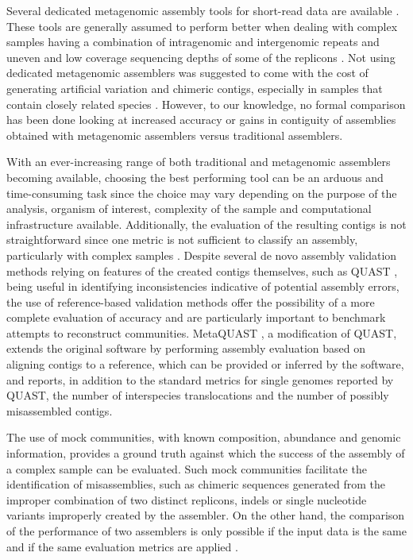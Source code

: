Several dedicated metagenomic assembly tools for short-read data are available \cite{ayling_new_2020}. These tools are generally assumed to perform better when dealing with complex samples having a combination of intragenomic and intergenomic repeats and uneven and low coverage sequencing depths of some of the replicons \cite{olson_metagenomic_2019}. Not using dedicated metagenomic assemblers was suggested to come with the cost of generating artificial variation and chimeric contigs, especially in samples that contain closely related species \cite{teeling_current_2012}. However, to our knowledge, no formal comparison has been done looking at increased accuracy or gains in contiguity of assemblies obtained with metagenomic assemblers versus traditional assemblers.

With an ever-increasing range of both traditional and metagenomic assemblers becoming available, choosing the best performing tool can be an arduous and time-consuming task since the choice may vary depending on the purpose of the analysis, organism of interest, complexity of the sample and computational infrastructure available. Additionally, the evaluation of the resulting contigs is not straightforward since one metric is not sufficient to classify an assembly, particularly with complex samples \cite{olson_metagenomic_2019,bradnam_assemblathon_2013}. Despite several de novo assembly validation methods relying on features of the created contigs themselves, such as QUAST \cite{gurevich_quast_2013}, being useful in identifying inconsistencies indicative of potential assembly errors, the use of reference-based validation methods offer the possibility of a more complete evaluation of accuracy and are particularly important to benchmark attempts to reconstruct communities. MetaQUAST \cite{bradnam_assemblathon_2013}, a modification of QUAST, extends the original software by performing assembly evaluation based on aligning contigs to a reference, which can be provided or inferred by the software, and reports, in addition to the standard metrics for single genomes reported by QUAST, the number of interspecies translocations and the number of possibly misassembled contigs.

The use of mock communities, with known composition, abundance and genomic information, provides a ground truth against which the success of the assembly of a complex sample can be evaluated. Such mock communities facilitate the identification of misassemblies, such as chimeric sequences generated from the improper combination of two distinct replicons, indels or single nucleotide variants improperly created by the assembler. On the other hand, the comparison of the performance of two assemblers is only possible if the input data is the same and if the same evaluation metrics are applied \cite{sczyrba_critical_2017}. 

